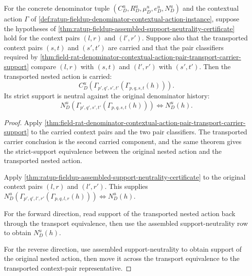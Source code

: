 
\begin{theorem}
\label{thm:ratup-fieldup-transported-support-neutrality-row}
For the concrete denominator tuple $(C_D^u,R_D^u,\mu_D^u,e_D^u,N_D^u)$ and the
contextual action $\Gamma$ of
\autoref{def:ratup-fieldup-denominator-contextual-action-instance}, suppose the
hypotheses of
\autoref{thm:ratup-fieldup-assembled-support-neutrality-certificate} hold for
the context pairs $(l,r)$ and $(l',r')$. Suppose also that the transported
context pairs $(s,t)$ and $(s',t')$ are carried and that the pair classifiers
required by
\autoref{thm:field-rat-denominator-contextual-action-pair-transport-carrier-support}
compare $(l,r)$ with $(s,t)$ and $(l',r')$ with $(s',t')$. Then the transported
nested action is carried:
$$
C_D^u(\Gamma_{p',q',s',t'}(\Gamma_{p,q,s,t}(h))).
$$
Its strict support is neutral against the original denominator history:
$$
N_D^u(\Gamma_{p',q',s',t'}(\Gamma_{p,q,s,t}(h)))
\Longleftrightarrow
N_D^u(h).
$$
\end{theorem}
\begin{proof}
Apply
\autoref{thm:field-rat-denominator-contextual-action-pair-transport-carrier-support}
to the carried context pairs and the two pair classifiers. The transported
carrier conclusion is the second carried component, and the same theorem gives
the strict-support equivalence between the original nested action and the
transported nested action.

Apply
\autoref{thm:ratup-fieldup-assembled-support-neutrality-certificate} to the
original context pairs $(l,r)$ and $(l',r')$. This supplies
$N_D^u(\Gamma_{p',q',l',r'}(\Gamma_{p,q,l,r}(h)))\Longleftrightarrow N_D^u(h)$.

For the forward direction, read support of the transported nested action back
through the transport equivalence, then use the assembled support-neutrality
row to obtain $N_D^u(h)$.

For the reverse direction, use assembled support-neutrality to obtain support
of the original nested action, then move it across the transport equivalence to
the transported context-pair representative.
\end{proof}

